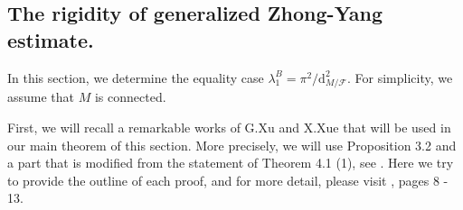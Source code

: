 \documentclass[11pt]{amsart}
\def\d{\mathrm{d}}
\def\ric{\mathrm{Ric}}
\def\He{{\mathrm{Hess}}}
\begin{document}


        
\subsection{The rigidity of generalized Zhong-Yang estimate.}\label{ililil}

In this section, we determine the equality case $\lambda_1^B=\pi^2/\d_{M/\mathcal{F}}^2$. For simplicity, we assume that $M$ is connected.








First, we will recall a remarkable works of G.Xu and X.Xue that will be used in our main theorem of this section. More precisely, we will use Proposition 3.2 and a part that is modified from the statement of Theorem 4.1 (1), see \cite{xuxue}. Here we try to provide the outline of each proof, and for more detail, please visit \cite{xuxue}, pages 8 - 13.
\end{document}

